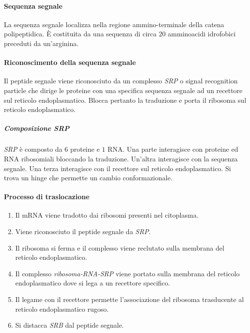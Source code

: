 			\paragraph{Sequenza segnale}
			La sequenza segnale localizza nella regione ammino-terminale della catena polipeptidica.
			\`E costituita da una sequenza di circa $20$ amminoacidi idrofobici preceduti da un'arginina.
			
			\paragraph{Riconoscimento della sequenza segnale}
			Il peptide segnale viene riconosciuto da un complesso \emph{SRP} o signal recognition particle che dirige le proteine con una specifica sequenza segnale ad un recettore sul reticolo endoplasmatico.
			Blocca pertanto la traduzione e porta il ribosoma sul reticolo endoplasmatico.

				\subparagraph{Composizione \emph{SRP}}
				\emph{SRP} \`e composto da $6$ proteine e $1$ RNA\@.
				Una parte interagisce con proteine ed RNA ribosomiali bloccando la traduzione.
				Un'altra interagisce con la sequenza segnale.
				Una terza interagisce con il recettore sul reticolo endoplasmatico.
				Si trova un hinge che permette un cambio conformazionale.

			\paragraph{Processo di traslocazione}
			\begin{multicols}{2}
				\begin{enumerate}
					\item Il mRNA viene tradotto dai ribosomi presenti nel citoplasma.
					\item Viene riconosciuto il peptide segnale da \emph{SRP}.
					\item Il ribosoma si ferma e il complesso viene reclutato sulla membrana del reticolo endoplasmatico.
					\item Il complesso \emph{ribosoma-RNA-SRP} viene portato sulla membrana del reticolo endoplasmatico dove si lega a un recettore specifico.
					\item Il legame con il recettore permette l'associazione del ribosoma trasducente al reticolo endoplasmatico rugoso.
					\item Si distacca \emph{SRB} dal peptide segnale.
				\end{enumerate}
			\end{multicols}

